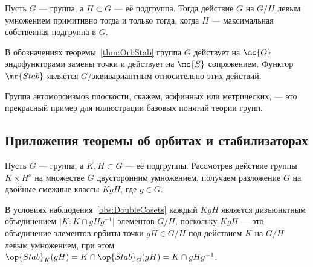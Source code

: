 \documentclass[
	extrafontsizes,
	11pt,
	hyphens,
]{memoir}
\begin{document}
\begin{corollary}
Пусть \(G\) --- группа, а \(H \subset G\) --- её подгруппа.
Тогда действие \(G\) на \(G/H\) левым умножением примитивно тогда и только тогда, когда \(H\) --- максимальная собственная подгруппа в \(G\).
\end{corollary}


\begin{remark}
В обозначениях теоремы~\ref{thm:OrbStab} группа \(G\) действует на \(\mc{O}\) эндофункторами замены точки и действует на \(\mc{S}\) сопряжением.
Функтор \(\mr{Stab}\) является \(G\)\=/эквивариантным относительно этих действий.
\end{remark}

\begin{remark}
Группа автоморфизмов плоскости, скажем, аффинных или метрических, --- это прекрасный пример для иллюстрации базовых понятий теории групп.
\end{remark}

\subsection{Приложения теоремы об орбитах и стабилизаторах}

\begin{observation} \label{obs:DoubleCosets}
Пусть \(G\) --- группа, а \(K,H \subset G\) --- её подгруппы.
Рассмотрев действие группы \(K \times H^o\) на множестве \(G\) двусторонним умножением,
получаем разложение \(G\) на двойные смежные классы \(KgH\), где \(g \in G\).
\end{observation}

\begin{observation}
В условиях наблюдения~\ref{obs:DoubleCosets} каждый \(KgH\) является дизъюнктным объединением \(\lvert K : K \cap gHg^{-1} \rvert\)
элементов \(G/H\),
поскольку \(KgH\) --- это объединение элементов орбиты точки \(gH \in G/H\) под
действием \(K\) на
\(G/H\) левым умножением,
при этом
\(\op{Stab}_K(gH) = K \cap \op{Stab}_G(gH) = K \cap gHg^{-1}\).
\end{observation}
\end{document}
